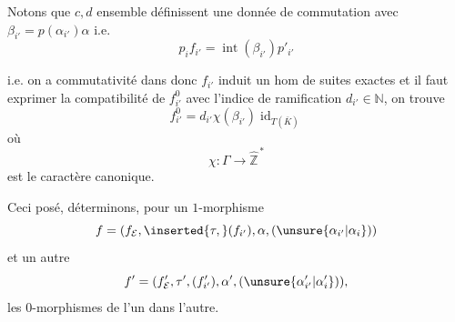 Notons que $c,d$ ensemble définissent une donnée de commutation
avec $\beta_{i'}=p(\alpha_{i'})\alpha$
i.e.
\[
p_i f_{i'}=\operatorname{int}(\beta_{i'})p'_{i'}
\]


i.e. on a commutativité dans
donc $f_{i'}$ induit un hom de suites exactes
et il faut exprimer la compatibilité de $f^0_{i'}$ avec l'indice de ramification $d_{i'}\in\mathbb N$, on trouve
\[
\boxed{f^0_{i'}=d_{i'}\chi(\beta_{i'})\operatorname{id}_{T(\bar K)}}
\]
où
\[
\chi:\Gamma\longrightarrow\widehat{\mathbb Z}^{\,*}
\]
est le caractère canonique.

Ceci posé, déterminons, pour un $1$-morphisme
\[
f=(f_{\mathcal E},\inserted{\tau,}(f_{i'}),\alpha,(\unsure{\alpha_{i'}|\alpha_i}))
\]
et un autre
\[
f'=(f'_{\mathcal E},\tau',(f'_{i'}),\alpha',(\unsure{\alpha'_{i'}|\alpha'_i})),
\]
les $0$-morphismes de l'un dans l'autre.
